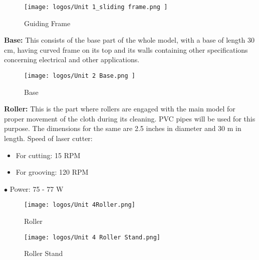 \documentclass[table,french,english]{rapportCS}
\begin{document}
\begin{figure}[h]
    \centering
    \texttt{[image: logos/Unit 1\_sliding frame.png ]}
    \caption{Guiding Frame}
    \label{fig:enter-label}
\end{figure}
\newpage

\vspace{0.8cm}
\textbf{Base:} 
This consists of the base part of the whole model, with a base of length 30 cm, having curved frame on its top and its walls containing other specifications concerning electrical and other applications.

\begin{figure}[h]
    \centering
    \texttt{[image: logos/Unit 2 Base.png ]}
    \caption{Base}
    \label{fig:enter-label}
\end{figure}
\newline
\vspace{0.8cm}
\textbf{Roller:} This is the part where rollers are engaged with the main model for proper movement of the cloth during its cleaning. PVC pipes will be used for this purpose. The dimensions for the same are 2.5 inches in diameter and 30 m in length.
\newline
\newpage
Speed of laser cutter:
\begin{itemize}
    \item For cutting: 15 RPM
    \item For grooving: 120 RPM
\end{itemize}
\newline

$\bullet$ Power: 75 - 77 W 

\begin{figure}[h]
    \centering
    \texttt{[image: logos/Unit 4Roller.png]}
    \caption{Roller}
    \label{fig:enter-label}
\end{figure}

\begin{figure}[h]
    \centering
    \texttt{[image: logos/Unit 4 Roller Stand.png]}
    \caption{Roller Stand}
    \label{fig:enter-label}
\end{figure}
\end{document}
